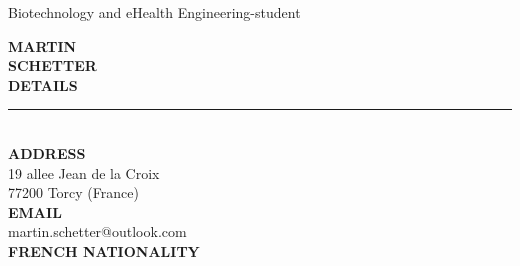 \documentclass[9pt,a4paper]{article}
\newcommand{\myname}[1]{\textbf{\huge\selectfont\MakeUppercase{#1}}\\}
\newcommand{\myjobtitle}[1]{{\Large #1}\\}
\newcommand{\myline}[1]{\rule{#1}{1.0pt}\\}
\newcommand{\topic}[1]{\textbf{\Large\selectfont\MakeUppercase{#1}}\\\vspace{-1em}\myline{1.0cm}}
\newcommand{\uppersubtopic}[1]{\textbf{\normalsize\selectfont\MakeUppercase{#1}}\\}
\begin{document}
\begin{flushleft}
    \myjobtitle{{\color{FireBrick}Biotechnology and eHealth Engineering-student}} %
\end{flushleft}
\vspace{-0.5em}


\noindent
\begin{minipage}[c]{0.3\linewidth}



\begin{flushleft}
    \myname{Martin} %
  \myname{SCHETTER} %

\vspace{1em}
\topic{DETAILS}
\uppersubtopic{address} 
19 allee Jean de la Croix\\
77200 Torcy (France)\\
\uppersubtopic{email}
martin.schetter@outlook.com\\ 
\uppersubtopic{French Nationality}
\vspace{0.1em} 


\end{flushleft}
\end{minipage}
\end{document}
